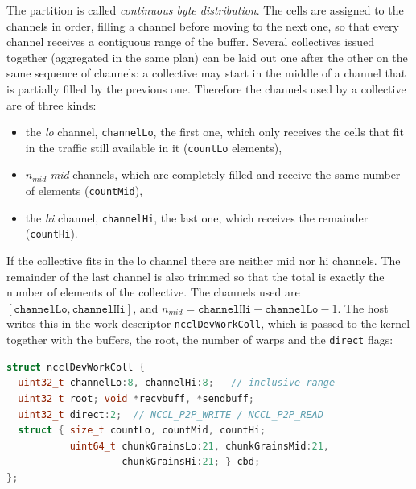 The partition is called \emph{continuous byte distribution}.
The cells are assigned to the channels in order, filling a channel before moving to the next one, so that every channel receives a contiguous range of the buffer.
Several collectives issued together (aggregated in the same plan) can be laid out one after the other on the same sequence of channels: a collective may start in the middle of a channel that is partially filled by the previous one.
Therefore the channels used by a collective are of three kinds:
\begin{itemize}
  \item the \emph{lo} channel, \texttt{channelLo}, the first one, which only receives the cells that fit in the traffic still available in it (\texttt{countLo} elements),
  \item $n_{mid}$ \emph{mid} channels, which are completely filled and receive the same number of elements (\texttt{countMid}),
  \item the \emph{hi} channel, \texttt{channelHi}, the last one, which receives the remainder (\texttt{countHi}).
\end{itemize}
If the collective fits in the lo channel there are neither mid nor hi channels. The remainder of the last channel is also trimmed so that the total is exactly the number of elements of the collective.
The channels used are $[\texttt{channelLo},\texttt{channelHi}]$, and $n_{mid}=\texttt{channelHi}-\texttt{channelLo}-1$.
The host writes this in the work descriptor \texttt{ncclDevWorkColl}, which is passed to the kernel together with the buffers, the root, the number of warps and the \texttt{direct} flags:
\begin{lstlisting}[language=C++,caption={Fields of \texttt{ncclDevWorkColl} that describe the CBD partition (simplified).},label={lst:cbd-fields}]
struct ncclDevWorkColl {
  uint32_t channelLo:8, channelHi:8;   // inclusive range
  uint32_t root; void *recvbuff, *sendbuff;
  uint32_t direct:2;  // NCCL_P2P_WRITE / NCCL_P2P_READ
  struct { size_t countLo, countMid, countHi;
           uint64_t chunkGrainsLo:21, chunkGrainsMid:21,
                    chunkGrainsHi:21; } cbd;
};
\end{lstlisting}

